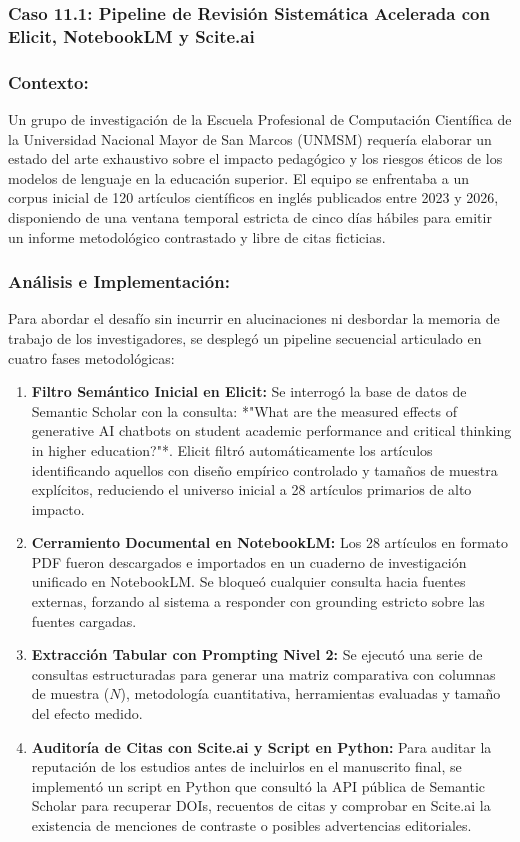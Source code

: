 \subsubsection{Caso 11.1: Pipeline de Revisión Sistemática Acelerada con Elicit, NotebookLM y Scite.ai}

\subsubsection*{Contexto:}
Un grupo de investigación de la Escuela Profesional de Computación Científica de la Universidad Nacional Mayor de San Marcos (UNMSM) requería elaborar un estado del arte exhaustivo sobre el impacto pedagógico y los riesgos éticos de los modelos de lenguaje en la educación superior. El equipo se enfrentaba a un corpus inicial de 120 artículos científicos en inglés publicados entre 2023 y 2026, disponiendo de una ventana temporal estricta de cinco días hábiles para emitir un informe metodológico contrastado y libre de citas ficticias.

\subsubsection*{Análisis e Implementación:}
Para abordar el desafío sin incurrir en alucinaciones ni desbordar la memoria de trabajo de los investigadores, se desplegó un pipeline secuencial articulado en cuatro fases metodológicas:

\begin{enumerate}
    \item \textbf{Filtro Semántico Inicial en Elicit:} Se interrogó la base de datos de Semantic Scholar con la consulta: *"What are the measured effects of generative AI chatbots on student academic performance and critical thinking in higher education?"*. Elicit filtró automáticamente los artículos identificando aquellos con diseño empírico controlado y tamaños de muestra explícitos, reduciendo el universo inicial a 28 artículos primarios de alto impacto.
    \item \textbf{Cerramiento Documental en NotebookLM:} Los 28 artículos en formato PDF fueron descargados e importados en un cuaderno de investigación unificado en NotebookLM. Se bloqueó cualquier consulta hacia fuentes externas, forzando al sistema a responder con grounding estricto sobre las fuentes cargadas.
    \item \textbf{Extracción Tabular con Prompting Nivel 2:} Se ejecutó una serie de consultas estructuradas para generar una matriz comparativa con columnas de muestra ($N$), metodología cuantitativa, herramientas evaluadas y tamaño del efecto medido.
    \item \textbf{Auditoría de Citas con Scite.ai y Script en Python:} Para auditar la reputación de los estudios antes de incluirlos en el manuscrito final, se implementó un script en Python que consultó la API pública de Semantic Scholar para recuperar DOIs, recuentos de citas y comprobar en Scite.ai la existencia de menciones de contraste o posibles advertencias editoriales.
\end{enumerate}

